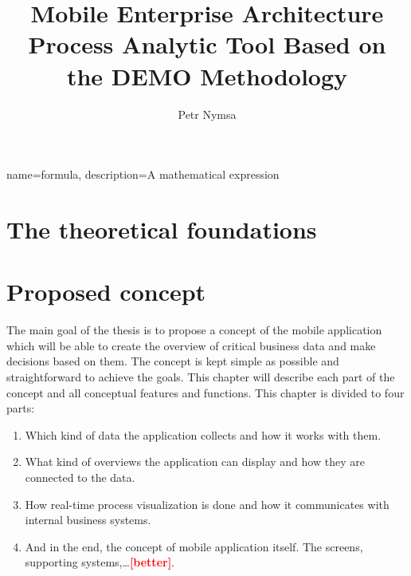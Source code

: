 \documentclass[thesis=B,english]{FITthesis}[2012/06/26]
\title{Mobile Enterprise Architecture Process Analytic Tool Based on the DEMO Methodology}
\author{Petr Nymsa} %
\newcommand{\todo}[1]{\textcolor{red}{\textbf{[#1]}}}
\begin{document}

{
        name=formula,
        description={A mathematical expression}
}


\begin{introduction}
	    
\end{introduction}

\chapter{The theoretical foundations}



\chapter{Proposed concept}
The main goal of the thesis is to propose a concept of the mobile application which will be able to create the overview of critical business data and make decisions based on them. The concept is kept simple as possible and straightforward to achieve the goals. This chapter will describe each part of the concept and all conceptual features and functions. This chapter is divided to four parts:	
    \begin{enumerate}
      \item Which kind of data the application collects and how it works with them.
      \item What kind of overviews the application can display and how they are connected to the data.
      \item How real-time process visualization is done and how it communicates with internal business systems.
      \item And in the end, the concept of mobile application itself. The screens, supporting systems,\dots \todo{better}.
    \end{enumerate}
    
\end{document}
